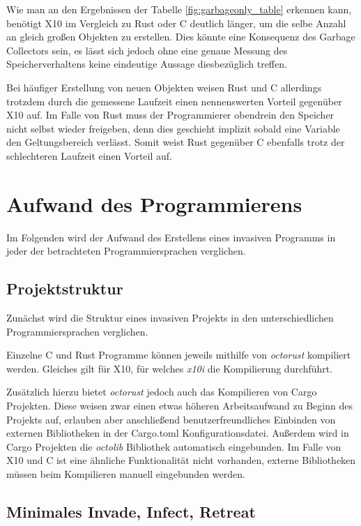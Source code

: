 Wie man an den Ergebnissen der Tabelle \ref{fig:garbageonly_table} erkennen kann,
benötigt X10 im Vergleich zu Rust oder C deutlich länger, um die selbe Anzahl an gleich großen Objekten zu erstellen. 
Dies könnte eine Konsequenz des Garbage Collectors sein, es lässt sich jedoch ohne eine genaue Messung des
Speicherverhaltens keine eindeutige Aussage diesbezüglich treffen.

Bei häufiger Erstellung von neuen Objekten weisen Rust und C allerdings trotzdem durch die gemessene Laufzeit
einen nennenswerten Vorteil gegenüber X10 auf. Im Falle von Rust muss der Programmierer obendrein
den Speicher nicht selbst wieder freigeben, denn dies geschieht implizit sobald eine Variable
den Geltungsbereich verlässt. Somit weist Rust gegenüber C ebenfalls trotz der schlechteren Laufzeit
einen Vorteil auf.

\section{Aufwand des Programmierens}

Im Folgenden wird der Aufwand des Erstellens eines invasiven Programms in jeder der betrachteten
Programmiersprachen verglichen.

\subsection{Projektstruktur}

Zunächst wird die Struktur eines invasiven Projekts in den unterschiedlichen Programmiersprachen verglichen.

Einzelne C und Rust Programme können jeweils mithilfe von \textit{octorust} kompiliert werden.
Gleiches gilt für X10, für welches \textit{x10i} die Kompilierung durchführt.

Zusätzlich hierzu bietet \textit{octorust} jedoch auch das Kompilieren von Cargo Projekten.
Diese weisen zwar einen etwas
höheren Arbeitsaufwand zu Beginn des Projekts auf, erlauben aber anschließend benutzerfreundliches Einbinden von
externen Bibliotheken in der Cargo.toml Konfigurationsdatei. Außerdem wird in Cargo Projekten
die \textit{octolib} Bibliothek automatisch eingebunden. Im Falle von X10 und C ist eine ähnliche
Funktionalität nicht vorhanden, externe Bibliotheken müssen beim Kompilieren manuell eingebunden werden.

\subsection{Minimales Invade, Infect, Retreat}

